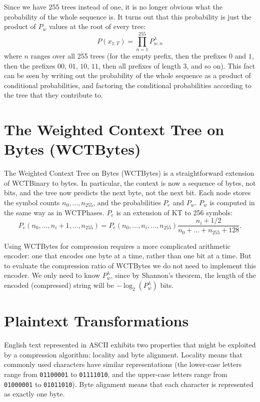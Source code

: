 \documentclass[11pt]{scrartcl}
\begin{document}
Since we have 255 trees instead of one, it is no longer obvious what the
probability of the whole sequence is. It turns out that this probability is
just the product of $P_w$ values at the root of every tree:
\[
P(x_{1:T}) = \prod_{n=1}^{255} P_{w, n}^\lambda
\]
where $n$ ranges over all 255 trees (for the empty prefix, then the prefixes
$0$ and $1$, then the prefixes $00$, $01$, $10$, $11$, then all prefixes of
length 3, and so on). This fact can be seen by writing out the probability of
the whole sequence as a product of conditional probabilities, and factoring the
conditional probabilities according to the tree that they contribute to.


\section{The Weighted Context Tree on Bytes (WCTBytes)}
\label{sec:wct-bytes}

The Weighted Context Tree on Bytes (WCTBytes) is a straightforward extension of
WCTBinary to bytes. In particular, the context is now a sequence of bytes, not
bits, and the tree now predicts the next byte, not the next bit. Each node
stores the symbol counts $n_0, ..., n_{255}$, and the probabilities $P_e$ and
$P_w$. $P_w$ is computed in the same way as in WCTPhases. $P_e$ is an
extension of KT to 256 symbols:
\[
P_e(n_0, ..., n_i + 1, ..., n_{255}) =
P_e(n_0, ..., n_i, ..., n_{255})
\frac{ n_i + 1/2 }{ n_0 + ... + n_{255} + 128 }.
\]

Using WCTBytes for compression requires a more complicated arithmetic encoder:
one that encodes one byte at a time, rather than one bit at a time. But to
evaluate the compression ratio of WCTBytes we do not need to implement this
encoder. We only need to know $P_w^\lambda$, since by Shannon's theorem, the
length of the encoded (compressed) string will be $-\log_2(P_w^\lambda)$ bits.


\section{Plaintext Transformations}
\label{sec:transformations}

English text represented in ASCII exhibits two properties that might be
exploited by a compression algorithm: locality and byte alignment. Locality
means that commonly used characters have similar representations (the
lower-case letters range from {\tt 01100001} to {\tt 01111010}, and the
upper-case letters range from {\tt 01000001} to {\tt 01011010}). Byte alignment
means that each character is represented as exactly one byte.
\end{document}
